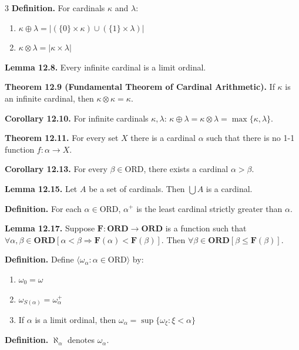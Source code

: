 \documentclass[landscape,8pt]{article}
\begin{document}
\begin{multicols}{3}
	\noindent\textbf{Definition.} For cardinals $\kappa$ and $\lambda$:
	\begin{enumerate}[noitemsep,topsep=0pt]
		\item $\kappa \oplus \lambda = |(\{0\} \times \kappa) \cup (\{1\} \times \lambda)|$
		\item $\kappa \otimes \lambda = |\kappa \times \lambda|$
	\end{enumerate}

	\noindent\textbf{Lemma 12.8.} Every infinite cardinal is a limit ordinal.

	\noindent\textbf{Theorem 12.9 (Fundamental Theorem of Cardinal Arithmetic).} If $\kappa$ is an infinite cardinal, then $\kappa \otimes \kappa = \kappa$.

	\noindent\textbf{Corollary 12.10.} For infinite cardinals $\kappa, \lambda$: $\kappa \oplus \lambda = \kappa \otimes \lambda = \max\{\kappa, \lambda\}$.

	\noindent\textbf{Theorem 12.11.} For every set $X$ there is a cardinal $\alpha$ such that there is no 1-1 function $f: \alpha \to X$.

	\noindent\textbf{Corollary 12.13.} For every $\beta \in \text{ORD}$, there exists a cardinal $\alpha > \beta$.

	\noindent\textbf{Lemma 12.15.} Let $A$ be a set of cardinals. Then $\bigcup A$ is a cardinal.

	\noindent\textbf{Definition.} For each $\alpha \in \text{ORD}$, $\alpha^+$ is the least cardinal strictly greater than $\alpha$.

	\noindent\textbf{Lemma 12.17.} Suppose $\textbf{F} : \textbf{ORD} \to \textbf{ORD}$ is a function such that $\forall \alpha, \beta \in \textbf{ORD} [\alpha < \beta \Rightarrow \textbf{F}(\alpha) < \textbf{F}(\beta)]$. Then $\forall \beta \in \textbf{ORD} [\beta \leq \mathbf{F}(\beta)]$.

	\noindent\textbf{Definition.} Define $\langle \omega_\alpha : \alpha \in \text{ORD} \rangle$ by:
	\begin{enumerate}[noitemsep,topsep=0pt]
		\item $\omega_0 = \omega$
		\item $\omega_{S(\alpha)} = \omega_\alpha^+$
		\item If $\alpha$ is a limit ordinal, then $\omega_\alpha = \sup\{\omega_\xi : \xi < \alpha\}$
	\end{enumerate}

	\noindent\textbf{Definition.} $\aleph_\alpha$ denotes $\omega_\alpha$.


\end{multicols}
\end{document}

